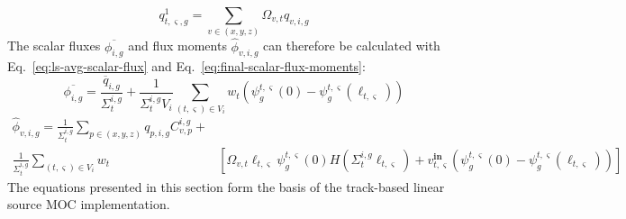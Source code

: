 \begin{equation}
	\nonumber
	q^1_{t,\varsigma,g} = \sum_{v \in (x,y,z)} \Omega_{v,t} q_{v,i,g}
\end{equation}
The scalar fluxes $\overline{\phi_{i,g}}$ and flux moments $\hat{\phi}_{v,i,g}$ can therefore be calculated with Eq.~\ref{eq:ls-avg-scalar-flux} and Eq.~\ref{eq:final-scalar-flux-moments}:
\begin{equation}
\nonumber
\overline{\phi_{i,g}} = \frac{\overline{q}_{i,g}}{\Sigma_{t}^{i,g}} + \frac{1}{\Sigma_{t}^{i,g} V_i} \sum_{(t,\varsigma) \in V_i} w_t \left(\psi^{t,\varsigma}_g(0) - \psi^{t,\varsigma}_g(\ell_{t,\varsigma}) \right)
\label{eq:ls-avg-scalar-flux-iter}
\end{equation}
\begin{equation}
\nonumber
\begin{split}
\hat{\phi}_{v,i,g} = \frac{1}{\Sigma_{t}^{i,g}} \sum_{p \in (x,y,z)} q_{p,i,g} C_{v,p}^{i,g} + & \\
\frac{1}{\Sigma_{t}^{i,g}} \sum_{(t,\varsigma) \in V_i} w_t & \left[\Omega_{v,t} \ell_{t,\varsigma} \psi^{t,\varsigma}_g(0) H(\Sigma_{t}^{i,g} \ell_{t,\varsigma}) + v^{\textbf{in}}_{t,\varsigma} \left(\psi^{t,\varsigma}_g(0) - \psi^{t,\varsigma}_g(\ell_{t,\varsigma}) \right)\right]
\end{split}
\label{eq:final-scalar-flux-moments-iter}
\end{equation}
The equations presented in this section form the basis of the track-based linear source \ac{MOC} implementation.


